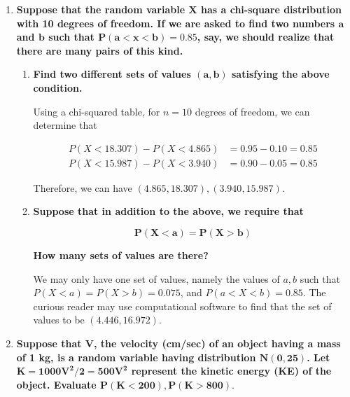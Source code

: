 \documentclass[10pt, oneside]{article}
\begin{document}
\begin{enumerate}[label=9.\arabic*]
\begin{proof}
\end{proof}

\item  \begin{tcolorbox}[
  colback=Cerulean!5!white,
  colframe=Cerulean!75!black]
\textbf{Suppose that the random variable $\bm{X}$ has a chi-square distribution with 10 degrees of freedom. If we are asked to find two numbers $\bm{a}$ and $\bm{b}$ such that $\bm{P(a < x < b) = 0.85}$, say, we should realize that there are many pairs of this kind.}
\end{tcolorbox}

	\begin{enumerate}
	\item  \begin{tcolorbox}[
	  colback=Cerulean!5!white,
	  colframe=Cerulean!75!black]
	\textbf{Find two different sets of values $\bm{(a,b)}$ satisfying the above condition.}
	\end{tcolorbox}
	
	Using a chi-squared table, for $n = 10$ degrees of freedom, we can determine that
	
	\begin{align*}
	P(X < 18.307) - P(X < 4.865) &= 0.95 - 0.10 = 0.85 \\
	P(X < 15.987) - P(X < 3.940) &= 0.90 - 0.05 = 0.85
	\end{align*}
	
	Therefore, we can have $\boxed{ (4.865, 18.307), (3.940, 15.987) }$.
	
	\item  \begin{tcolorbox}[
	  colback=Cerulean!5!white,
	  colframe=Cerulean!75!black]
	\textbf{Suppose that in addition to the above, we require that}
	
	\[ \bm{P(X < a) = P(X > b)} \]
	
	\textbf{How many sets of values are there?}
	\end{tcolorbox}
	
	We may only have $\boxed{\text{one}}$ set of values, namely the values of $a, b$ such that $P(X < a) = P(X > b) = 0.075$, and $P(a < X < b) = 0.85$. The curious reader may use computational software to find that the set of values to be $(4.446, 16.972)$.
	
	\end{enumerate}

\item  \begin{tcolorbox}[
  colback=Cerulean!5!white,
  colframe=Cerulean!75!black]
\textbf{Suppose that $\bm{V}$, the velocity (cm/sec) of an object having a mass of 1 kg, is a random variable having distribution $\bm{N(0, 25)}$. Let $\bm{K = 1000V^2/2 = 500V^2}$ represent the kinetic energy (KE) of the object. Evaluate $\bm{P(K < 200), P(K > 800).}$}
\end{tcolorbox}


\end{enumerate}
\end{document}
